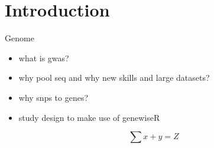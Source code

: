 \documentclass{bioinfo}
\begin{document}
\section{Introduction}

Genome

\begin{itemize}
\item what is gwas?
\item why pool seq and why new skills and large datasets?
\item why snps to genes?
\item study design to make use of genewiseR
\end{itemize}

\begin{equation}
\sum x+ y =Z\label{eq:01}
\end{equation}
\end{document}
